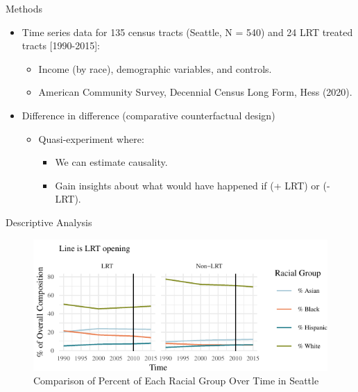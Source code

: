 \documentclass[11pt,ignorenonframetext,]{beamer}
\providecommand{\tightlist}{%
  \setlength{\itemsep}{0pt}\setlength{\parskip}{0pt}}
\begin{document}
\begin{frame}{Methods}
\protect\hypertarget{methods}{}

\begin{itemize}
\tightlist
\item
  Time series data for 135 census tracts (Seattle, N = 540) and 24 LRT
  treated tracts {[}1990-2015{]}:

  \begin{itemize}
  \tightlist
  \item
    Income (by race), demographic variables, and controls.
  \item
    American Community Survey, Decennial Census Long Form, Hess (2020).
  \end{itemize}
\item
  Difference in difference (comparative counterfactual design)

  \begin{itemize}
  \tightlist
  \item
    Quasi-experiment where:

    \begin{itemize}
    \tightlist
    \item
      We can estimate causality.
    \item
      Gain insights about what would have happened if (+ LRT) or (-LRT).
    \end{itemize}
  \end{itemize}
\end{itemize}

\end{frame}

\begin{frame}{Descriptive Analysis}
\protect\hypertarget{descriptive-analysis}{}

\begin{figure}

{\centering \includegraphics{csde_talk_files/figure-beamer/unnamed-chunk-3-1} 

}

\caption{Comparison of Percent of Each Racial Group Over Time in Seattle}\label{fig:unnamed-chunk-3}
\end{figure}

\end{frame}
\end{document}
